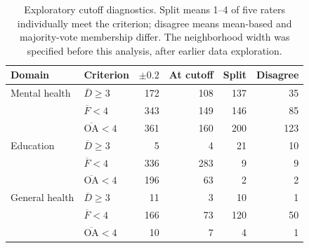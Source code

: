 \begin{table}[htbp]
\centering\small
\caption{Exploratory cutoff diagnostics. Split means 1--4 of five raters individually meet the criterion; disagree means mean-based and majority-vote membership differ. The neighborhood width was specified before this analysis, after earlier data exploration.}
\label{tab:cutoffs}
\begin{tabular}{llrrrr}
\toprule
Domain & Criterion & $\pm0.2$ & At cutoff & Split & Disagree \\
\midrule
Mental health & $\overline D\geq3$ & 172 & 108 & 137 & 35 \\
 & $\overline F<4$ & 343 & 149 & 146 & 85 \\
 & $\overline{\mathrm{OA}}<4$ & 361 & 160 & 200 & 123 \\
Education & $\overline D\geq3$ & 5 & 4 & 21 & 10 \\
 & $\overline F<4$ & 336 & 283 & 9 & 9 \\
 & $\overline{\mathrm{OA}}<4$ & 196 & 63 & 2 & 2 \\
General health & $\overline D\geq3$ & 11 & 3 & 10 & 1 \\
 & $\overline F<4$ & 166 & 73 & 120 & 50 \\
 & $\overline{\mathrm{OA}}<4$ & 10 & 7 & 4 & 1 \\
\bottomrule
\end{tabular}
\end{table}
